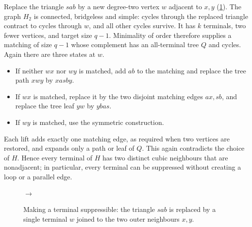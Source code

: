 \documentclass[a4paper,11pt]{article}
\numberwithin{equation}{section}
\newcommand{\transarrow}{\ensuremath{\longrightarrow}}
\begin{document}
Replace the triangle $sab$ by a new degree-two vertex $w$ adjacent to $x,y$
(\cref{fig:reduction-triangle}). The graph $H_2$ is connected, bridgeless and
simple: cycles through the replaced triangle contract to cycles through $w$, and
all other cycles survive. It has $k$ terminals, two fewer vertices, and target
size $q-1$. Minimality of order therefore supplies a matching of size $q-1$
whose complement has an all-terminal tree $Q$ and cycles. Again there are three
states at $w$.
\begin{itemize}
  \item If neither $wx$ nor $wy$ is matched, add $ab$ to the matching and
    replace the tree path $xwy$ by $xasby$.
  \item If $wx$ is matched, replace it by the two disjoint matching edges
    $ax,sb$, and replace the tree leaf $yw$ by $ybas$.
  \item If $wy$ is matched, use the symmetric construction.
\end{itemize}
Each lift adds exactly one matching edge, as required when two vertices are
restored, and expands only a path or leaf of $Q$. This again contradicts the
choice of $H$. Hence every terminal of $H$ has two distinct cubic neighbours
that are nonadjacent; in particular, every terminal can be suppressed without
creating a loop or a parallel edge.

\begin{figure}[ht]
  \centering
  \qquad\transarrow\qquad
  \caption{Making a terminal suppressible: the triangle $sab$ is replaced by a
  single terminal $w$ joined to the two outer neighbours $x,y$.}
  \label{fig:reduction-triangle}
\end{figure}
\end{document}
